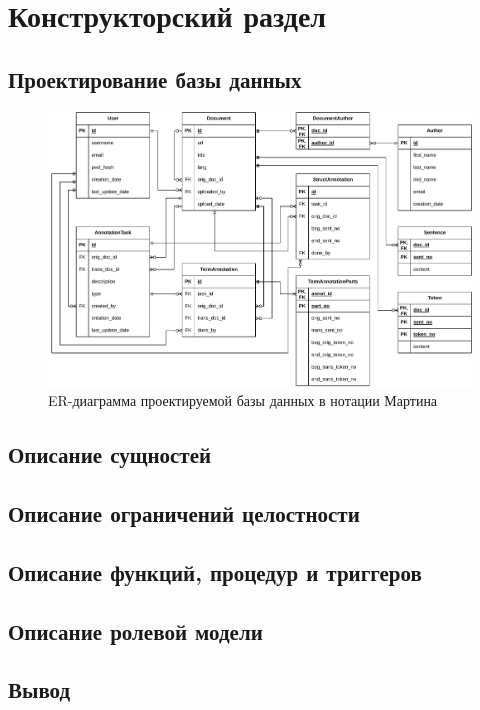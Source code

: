 \section{Конструкторский раздел}

\subsection{Проектирование базы данных}

\begin{figure}[H]
	\centering
	\includegraphics[width=\textwidth]{diag/crow-foot-erd.pdf}
	\caption{ER-диаграмма проектируемой базы данных в нотации Мартина}
	\label{fig:erd}
\end{figure}

\subsection{Описание сущностей}

\subsection{Описание ограничений целостности}

\subsection{Описание функций, процедур и триггеров}

\subsection{Описание ролевой модели}

\subsection{Вывод}
